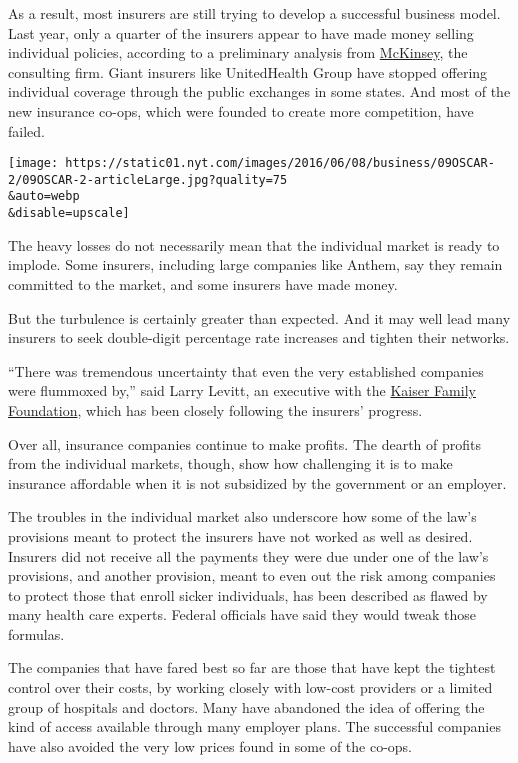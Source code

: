 As a result, most insurers are still trying to develop a successful
business model. Last year, only a quarter of the insurers appear to have
made money selling individual policies, according to a preliminary
analysis from
\href{http://healthcare.mckinsey.com/sites/default/files/Intel\%20Brief\%20-\%20Individual\%20Market\%20Performance\%20and\%20Outlook\%20\%28public\%29_vF.pdf}{McKinsey},
the consulting firm. Giant insurers like UnitedHealth Group have stopped
offering individual coverage through the public exchanges in some
states. And most of the new insurance co-ops, which were founded to
create more competition, have failed.

\texttt{[image: https://static01.nyt.com/images/2016/06/08/business/09OSCAR-2/09OSCAR-2-articleLarge.jpg?quality=75\\\&auto=webp\\\&disable=upscale]}

The heavy losses do not necessarily mean that the individual market is
ready to implode. Some insurers, including large companies like Anthem,
say they remain committed to the market, and some insurers have made
money.

But the turbulence is certainly greater than expected. And it may well
lead many insurers to seek double-digit percentage rate increases and
tighten their networks.

``There was tremendous uncertainty that even the very established
companies were flummoxed by,'' said Larry Levitt, an executive with the
\href{http://kff.org/}{Kaiser Family Foundation}, which has been closely
following the insurers' progress.

Over all, insurance companies continue to make profits. The dearth of
profits from the individual markets, though, show how challenging it is
to make insurance affordable when it is not subsidized by the government
or an employer.

The troubles in the individual market also underscore how some of the
law's provisions meant to protect the insurers have not worked as well
as desired. Insurers did not receive all the payments they were due
under one of the law's provisions, and another provision, meant to even
out the risk among companies to protect those that enroll sicker
individuals, has been described as flawed by many health care experts.
Federal officials have said they would tweak those formulas.

The companies that have fared best so far are those that have kept the
tightest control over their costs, by working closely with low-cost
providers or a limited group of hospitals and doctors. Many have
abandoned the idea of offering the kind of access available through many
employer plans. The successful companies have also avoided the very low
prices found in some of the co-ops.

